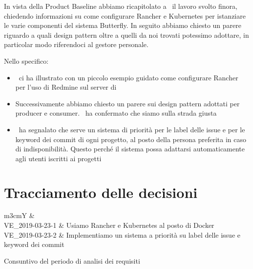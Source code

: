         In vista della Product Baseline abbiamo ricapitolato a \DZ~il lavoro svolto finora, chiedendo informazioni su come configurare Rancher e Kubernetes per istanziare le varie componenti del sistema Butterfly.
        In seguito abbiamo chiesto un parere riguardo a quali design pattern oltre a quelli da noi trovati potessimo adottare, in particolar modo riferendoci al gestore personale.
        
        
        Nello specifico:
        \begin{itemize}
            \item \DZ~ci ha illustrato con un piccolo esempio guidato come configurare Rancher per l'uso di Redmine sul server di \II
            \item Successivamente abbiamo chiesto un parere sui design pattern adottati per producer e consumer. \DZ~ha confermato che siamo sulla strada giusta
            \item \DZ~ha segnalato che serve un sistema di priorità per le label delle issue e per le keyword dei commit di ogni progetto, al posto della persona preferita in caso di indisponibilità. Questo perché il sistema possa adattarsi automaticamente agli utenti iscritti ai progetti
        \end{itemize}
        
    \section{Tracciamento delle decisioni}
    
        \begin{table}[H]
		    \begin{detailtable}{\columnwidth}{m{3cm}Y}
			     &
			    \\\toprule\rowcolor{\tablegray}
			    VE\_2019-03-23-1 & Usiamo Rancher e Kubernetes al posto di Docker\\
			    VE\_2019-03-23-2 & Implementiamo un sistema a priorità su label delle issue e keyword dei commit\\\bottomrule
		    \end{detailtable}
		    \caption{Consuntivo del periodo di analisi dei requisiti}
	    \end{table}
    	

